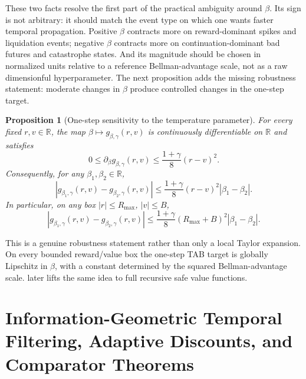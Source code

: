 \documentclass{article}
\newtheorem{proposition}[proposition]{Proposition}
\theoremstyle{remark}
\newcommand{\R}{\mathbb{R}}
\begin{document}
These two facts resolve the first part of the practical ambiguity around $\beta$. Its sign is not arbitrary: it should match the event type on which one wants faster temporal propagation. Positive $\beta$ contracts more on reward-dominant spikes and liquidation events; negative $\beta$ contracts more on continuation-dominant bad futures and catastrophe states. And its magnitude should be chosen in normalized units relative to a reference Bellman-advantage scale, not as a raw dimensionful hyperparameter. The next proposition adds the missing robustness statement: moderate changes in $\beta$ produce controlled changes in the one-step target.

\begin{proposition}[One-step sensitivity to the temperature parameter]
\label{prop:beta-sensitivity}
For every fixed $r,v\in\R$, the map $\beta\mapsto g_{\beta,\gamma}(r,v)$ is continuously differentiable on $\R$ and satisfies
\begin{equation}
0\le \partial_\beta g_{\beta,\gamma}(r,v)\le \frac{1+\gamma}{8}(r-v)^2.
\label{eq:beta-sensitivity-derivative}
\end{equation}
Consequently, for any $\beta_1,\beta_2\in\R$,
\begin{equation}
|g_{\beta_1,\gamma}(r,v)-g_{\beta_2,\gamma}(r,v)|
\le
\frac{1+\gamma}{8}(r-v)^2|\beta_1-\beta_2|.
\label{eq:beta-sensitivity-target}
\end{equation}
In particular, on any box $|r|\le R_{\max}$, $|v|\le B$,
\begin{equation}
|g_{\beta_1,\gamma}(r,v)-g_{\beta_2,\gamma}(r,v)|
\le
\frac{1+\gamma}{8}(R_{\max}+B)^2|\beta_1-\beta_2|.
\label{eq:beta-sensitivity-box}
\end{equation}
\end{proposition}

This is a genuine robustness statement rather than only a local Taylor expansion. On every bounded reward/value box the one-step TAB target is globally Lipschitz in $\beta$, with a constant determined by the squared Bellman-advantage scale.  later lifts the same idea to full recursive safe value functions.



\section{Information-Geometric Temporal Filtering, Adaptive Discounts, and Comparator Theorems}
\label{sec:temporal-regret}
\end{document}
